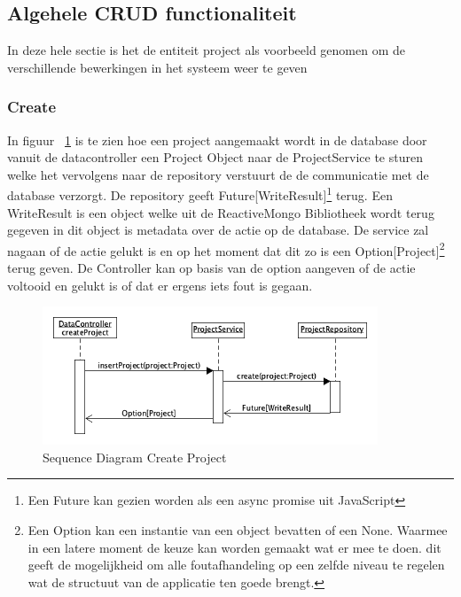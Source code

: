 \subsection{Algehele CRUD functionaliteit}\label{subsec:algehele-crud-functionaliteit}
In deze hele sectie is het de entiteit project als voorbeeld genomen om de verschillende bewerkingen in het systeem weer te geven
\subsubsection*{Create}
In figuur ~\ref{fig:seqdiagcreateProj} is te zien hoe een project aangemaakt wordt in de database door vanuit de datacontroller een Project Object naar de ProjectService te sturen welke het vervolgens naar de repository verstuurt de de communicatie met de database verzorgt. De repository geeft Future[WriteResult]\footnote{Een Future kan gezien worden als een async promise uit JavaScript} terug. Een WriteResult is een object welke uit de ReactiveMongo Bibliotheek wordt terug gegeven in dit object is metadata over de actie op de database. De service zal nagaan of de actie gelukt is en op het moment dat dit zo is een Option[Project]\footnote{Een Option kan een instantie van een object bevatten of een None. Waarmee in een latere moment de keuze kan worden gemaakt wat er mee te doen. dit geeft de mogelijkheid om alle foutafhandeling op een zelfde niveau te regelen wat de structuut van de applicatie ten goede brengt.} terug geven. De Controller kan op basis van de option aangeven of de actie voltooid en gelukt is of dat er ergens iets fout is gegaan.
\begin{figure}[h]
    \myfloatalign
    \includegraphics[width=10cm]{gfx/umlet/exports/CRUD-CreateProject}
    \caption{Sequence Diagram Create Project }
    \label{fig:seqdiagcreateProj}
\end{figure}




